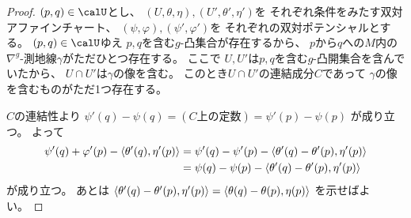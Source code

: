 \documentclass[report]{jlreq}
\begin{document}
\begin{proof}
    $(p, q) \in \calU$とし、
    $(U, \theta, \eta), (U', \theta', \eta')$を
    それぞれ条件をみたす双対アファインチャート、
    $(\psi, \varphi), (\psi', \varphi')$を
    それぞれの双対ポテンシャルとする。
    $(p, q) \in \calU$ゆえ
    $p, q$を含む$g$-凸集合が存在するから、
    $p$から$q$への$M$内の$\nabla^g$-測地線$\gamma$がただひとつ存在する。
    ここで
    $U, U'$は$p, q$を含む$g$-凸開集合を含んでいたから、
    $U \cap U'$は$\gamma$の像を含む。
    このとき$U \cap U'$の連結成分$C$であって
    $\gamma$の像を含むものがただ1つ存在する。

    $C$の連結性より
    $\psi'(q) - \psi(q)
        = (\text{$C$上の定数})
        = \psi'(p) - \psi(p)$
    が成り立つ。
    よって
    \begin{alignat}{1}
        \psi'(q) + \varphi'(p) - \left\langle{\theta'(q)},{\eta'(p)}\right\rangle
            &=
                \psi'(q) - \psi'(p) - \left\langle{\theta'(q) - \theta'(p)},{\eta'(p)}\right\rangle
                \\
            &=
                \psi(q) - \psi(p) - \left\langle{\theta'(q) - \theta'(p)},{\eta'(p)}\right\rangle
    \end{alignat}
    が成り立つ。
    あとは
    $\left\langle{\theta'(q) - \theta'(p)},{\eta'(p)}\right\rangle
        = \left\langle{\theta(q) - \theta(p)},{\eta(p)}\right\rangle$
    を示せばよい。


\end{proof}
\end{document}
